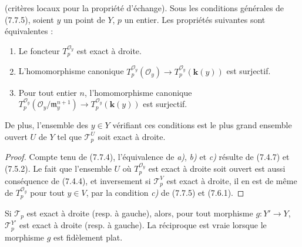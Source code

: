 \begin{proposition}[7.7.10]
\textnormal{(critères locaux pour la propriété d'échange).} Sous les conditions
générales de \textup{(7.7.5)}, soient $y$ un point de $Y$, $p$ un entier. Les propriétés
suivantes sont équivalentes :
\begin{enumerate}
  \item[\textup{a)}] Le foncteur $T_p^{\mathscr O_y}$ est exact à droite.

  \item[\textup{b)}] L'homomorphisme canonique
    $      T_p^{\mathscr O_y}(\mathscr O_y)
      \longrightarrow
      T_p^{\mathscr O_y}(\boldsymbol{k}(y))$
    est surjectif.

  \item[\textup{c)}] Pour tout entier $n$, l'homomorphisme canonique
    $      T_p^{\mathscr O_y}
      (\mathscr O_y/\mathfrak m_y^{n+1})
      \longrightarrow
      T_p^{\mathscr O_y}(\boldsymbol{k}(y))$
    est surjectif.
\end{enumerate}

De plus, l'ensemble des $y\in Y$ vérifiant ces conditions est le plus grand
ensemble ouvert $U$ de $Y$ tel que $\mathscr T_p^U$ soit exact à droite.
\end{proposition}

\begin{proof}
Compte tenu de (7.7.4), l'équivalence de \emph{a)}, \emph{b)} et \emph{c)} résulte de (7.4.7) et
(7.5.2). Le fait que l'ensemble $U$ où $T_p^{\mathscr O_y}$ est exact à droite
soit ouvert est aussi conséquence de (7.4.4), et inversement si
$\mathscr T_p^V$ est exact à droite, il en est de même de
$T_p^{\mathscr O_y}$ pour tout $y\in V$, par la condition \emph{c)} de (7.7.5) et
(7.6.1).
\end{proof}

\begin{corollary}[7.7.11]
Si $\mathscr T_p$ est exact à droite \textup{(resp.} à gauche\textup{)}, alors, pour tout morphisme
$g:Y'\to Y$, $\mathscr T_p^{Y'}$ est exact à droite \textup{(resp.} à gauche\textup{)}. La
réciproque est vraie lorsque le morphisme $g$ est fidèlement plat.
\end{corollary}


